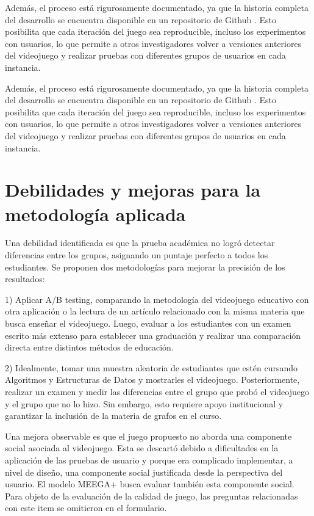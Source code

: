 Además, el proceso está rigurosamente documentado, ya que la historia completa del desarrollo se encuentra disponible en un repositorio de Github \cite{GithubRepo}. Esto posibilita que cada iteración del juego sea reproducible, incluso los experimentos con usuarios, lo que permite a otros investigadores volver a versiones anteriores del videojuego y realizar pruebas con diferentes grupos de usuarios en cada instancia.

Además, el proceso está rigurosamente documentado, ya que la historia completa del desarrollo se encuentra disponible en un repositorio de Github \cite{GithubRepo}. Esto posibilita que cada iteración del juego sea reproducible, incluso los experimentos con usuarios, lo que permite a otros investigadores volver a versiones anteriores del videojuego y realizar pruebas con diferentes grupos de usuarios en cada instancia.


\section{Debilidades y mejoras para la metodología aplicada}

Una debilidad identificada es que la prueba académica no logró detectar diferencias entre los grupos, asignando un puntaje perfecto a todos los estudiantes. Se proponen dos metodologías para mejorar la precisión de los resultados:

1) Aplicar A/B testing, comparando la metodología del videojuego educativo con otra aplicación o la lectura de un artículo relacionado con la misma materia que busca enseñar el videojuego. Luego, evaluar a los estudiantes con un examen escrito más extenso para establecer una graduación y realizar una comparación directa entre distintos métodos de educación.

2) Idealmente, tomar una muestra aleatoria de estudiantes que estén cursando Algoritmos y Estructuras de Datos y mostrarles el videojuego. Posteriormente, realizar un examen y medir las diferencias entre el grupo que probó el videojuego y el grupo que no lo hizo. Sin embargo, esto requiere apoyo institucional y garantizar la inclusión de la materia de grafos en el curso.


Una mejora observable es que el juego propuesto no aborda una componente social asociada al videojuego. Esta se descartó debido a dificultades en la aplicación de las pruebas de usuario y porque era complicado implementar, a nivel de diseño, una componente social justificada desde la perspectiva del usuario. El modelo MEEGA+ \cite{meegaplus} busca evaluar también esta componente social. Para objeto de la evaluación de la calidad de juego, las preguntas relacionadas con este item se omitieron en el formulario.

